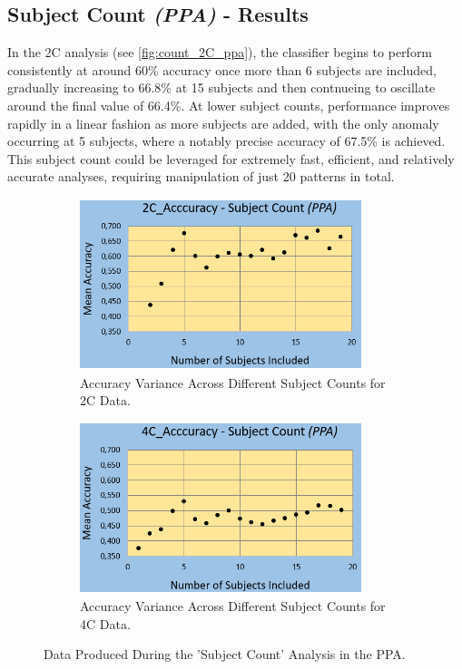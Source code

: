 \subsection{Subject Count \textit{(PPA)} - Results}

In the \gls{2C} analysis (see \autoref{fig:count_2C_ppa}), the classifier begins to perform consistently at around 60\% accuracy once more than 6 subjects are included, gradually increasing to 66.8\% at 15 subjects and then contnueing to oscillate around the final value of 66.4\%. At lower subject counts, performance improves rapidly in a linear fashion as more subjects are added, with the only anomaly occurring at 5 subjects, where a notably precise accuracy of 67.5\% is achieved. This subject count could be leveraged for extremely fast, efficient, and relatively accurate analyses, requiring manipulation of just 20 patterns in total.

\begin{figure}[htbp]
 	\centering
	\begin{subfigure}{0.49\textwidth}
		\centering
		\includegraphics[width = 0.9\textwidth, height = 5cm]{assets/images/subj_count_2C_ppa.png}
		\caption{Accuracy Variance Across Different Subject Counts for \gls{2C} Data.}
		\label{fig:count_2C_ppa}
	\end{subfigure}
	\hfill
	\begin{subfigure}{0.49\textwidth}
		\centering
	 	\includegraphics[width = 0.9\textwidth, height = 5cm]{assets/images/subj_count_4C_ppa.png}
		\caption{Accuracy Variance Across Different Subject Counts for \gls{4C} Data.}
		\label{fig:count_4C_ppa}
	\end{subfigure}
	\caption[Accuracies Across Subject Counts For The PPA]{Data Produced During the 'Subject Count' Analysis in the \gls{PPA}.}
 	\label{fig:count_ppa}
\end{figure} 

